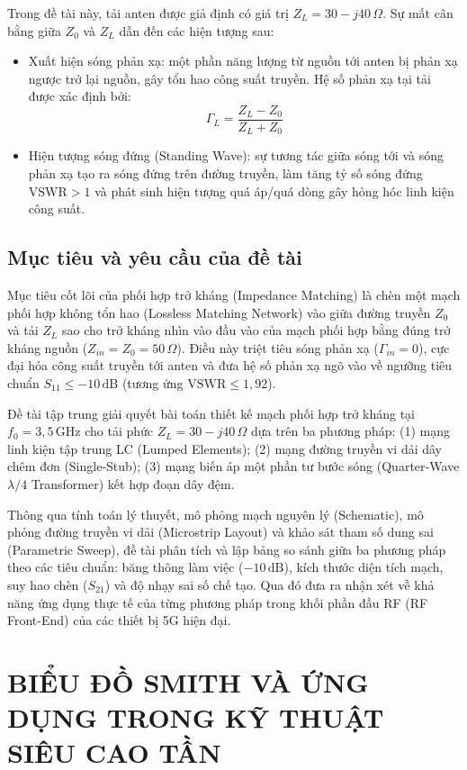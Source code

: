 \documentclass[a4paper]{report}
\newcommand\Zo{Z_0}
\newcommand\ZL{Z_L}
\newcommand\GL{\Gamma_L}
\newcommand\dB{\,\mathrm{dB}}
\newcommand\GHz{\,\mathrm{GHz}}
\begin{document}
Trong đề tài này, tải anten được giả định có giá trị $\ZL = 30 - j40\,\Omega$. Sự mất cân bằng giữa $\Zo$ và $\ZL$ dẫn đến các hiện tượng sau:
\begin{itemize}
  \item Xuất hiện sóng phản xạ: một phần năng lượng từ nguồn tới anten bị phản xạ ngược trở lại nguồn, gây tổn hao công suất truyền. Hệ số phản xạ tại tải được xác định bởi:
  \begin{equation}
    \GL = \frac{\ZL - \Zo}{\ZL + \Zo}
  \end{equation}
  \item Hiện tượng sóng đứng (Standing Wave): sự tương tác giữa sóng tới và sóng phản xạ tạo ra sóng đứng trên đường truyền, làm tăng tỷ số sóng đứng $\mathrm{VSWR}>1$ và phát sinh hiện tượng quá áp/quá dòng gây hỏng hóc linh kiện công suất.
\end{itemize}

\subsection{Mục tiêu và yêu cầu của đề tài}
Mục tiêu cốt lõi của phối hợp trở kháng (Impedance Matching) là chèn một mạch phối hợp không tổn hao (Lossless Matching Network) vào giữa đường truyền $\Zo$ và tải $\ZL$ sao cho trở kháng nhìn vào đầu vào của mạch phối hợp bằng đúng trở kháng nguồn ($Z_{in}=\Zo=50\,\Omega$). Điều này triệt tiêu sóng phản xạ ($\Gamma_{in}=0$), cực đại hóa công suất truyền tới anten và đưa hệ số phản xạ ngõ vào về ngưỡng tiêu chuẩn $S_{11}\le -10\dB$ (tương ứng $\mathrm{VSWR}\le 1{,}92$).

Đề tài tập trung giải quyết bài toán thiết kế mạch phối hợp trở kháng tại $f_0=3{,}5\GHz$ cho tải phức $\ZL=30-j40\,\Omega$ dựa trên ba phương pháp: (1) mạng linh kiện tập trung LC (Lumped Elements); (2) mạng đường truyền vi dải dây chêm đơn (Single-Stub); (3) mạng biến áp một phần tư bước sóng (Quarter-Wave $\lambda/4$ Transformer) kết hợp đoạn dây đệm.

Thông qua tính toán lý thuyết, mô phỏng mạch nguyên lý (Schematic), mô phỏng đường truyền vi dải (Microstrip Layout) và khảo sát tham số dung sai (Parametric Sweep), đề tài phân tích và lập bảng so sánh giữa ba phương pháp theo các tiêu chuẩn: băng thông làm việc ($-10\dB$), kích thước diện tích mạch, suy hao chèn ($S_{21}$) và độ nhạy sai số chế tạo. Qua đó đưa ra nhận xét về khả năng ứng dụng thực tế của từng phương pháp trong khối phần đầu RF (RF Front-End) của các thiết bị 5G hiện đại.

\section{BIỂU ĐỒ SMITH VÀ ỨNG DỤNG TRONG KỸ THUẬT SIÊU CAO TẦN}
\end{document}
